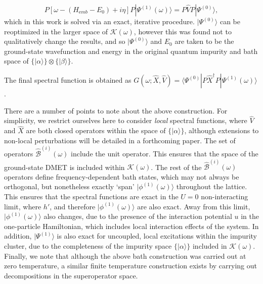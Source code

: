 \documentclass[aps,twocolumn,nobibnotes]{revtex4}
\begin{document}
\begin{inparaenum}
\begin{equation}
    P \left[ \omega - (H_{\mathrm emb}-E_0) + i \eta \right] P | \Psi^{(1)}(\omega) \rangle = P {\hat V} P |\Psi^{(0)} \rangle   ,   \label{eqn:ExactResponse}
\end{equation}
which in this work is solved via an exact, iterative procedure\cite{Langou2005}.
$|\Psi^{(0)} \rangle$ can be reoptimized in the larger space of $\mathcal{K}(\omega)$, however this was found not to qualitatively change the results, and 
so $|\Psi^{(0)}\rangle$ and $E_0$ are taken to be the ground-state wavefunction and energy in the 
original quantum impurity and bath space of $\{ | \alpha \rangle \} \otimes \{ | \beta \rangle \}$.
\item The final spectral function is obtained as $G(\omega; \hat{X}, \hat{V}) = \langle \Psi^{(0)} | P \hat{X}^{\dagger} P | \Psi^{(1)}(\omega) \rangle$.
\end{inparaenum}

There are a number of points to note about the above construction. For simplicity, we restrict ourselves here to consider {\em local} spectral functions, where
${\hat V}$ and ${\hat X}$ are both closed operators within the space of $\{|\alpha \rangle \}$, although extensions to non-local perturbations will be detailed in a forthcoming paper.
The set of operators ${\hat {\mathcal{B}}}^{(i)}(\omega)$ include the unit operator.
This ensures that
the space of the ground-state DMET is included within $\mathcal{K}(\omega)$. The rest of the ${\hat {\mathcal{B}}}^{(i)}(\omega)$ operators define frequency-dependent
bath states, which may not always be orthogonal, but nonetheless exactly `span' $|\phi^{(1)}(\omega) \rangle$ throughout the lattice. This ensures that the spectral functions are exact in 
the $U=0$ non-interacting limit, where $h'$, and therefore $|\phi^{(1)}(\omega) \rangle$ are also exact. Away from this limit, 
$|\phi^{(1)}(\omega) \rangle$ also changes, due to the presence of the interaction potential $u$ in the one-particle Hamiltonian, which 
includes local interaction effects of the system.
In addition, $|\Psi^{(1)} \rangle $ is also exact for uncoupled, local excitations within the impurity cluster, due
to the completeness of the impurity space $\{ |\alpha \rangle \}$ included in $\mathcal{K}(\omega)$.
Finally, we note that although the above bath construction was carried out at zero temperature, a similar finite temperature construction exists by carrying 
out decompositions in the superoperator space.
\end{document}
